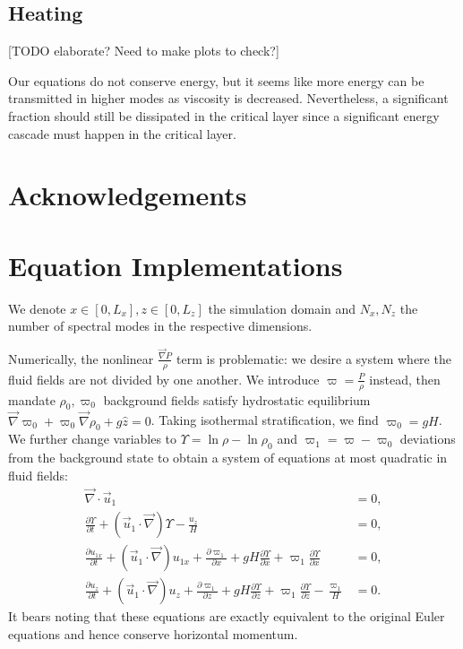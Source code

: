 \documentclass[
        fleqn,
        usenatbib,
    ]{mnras}
\newcommand*{\pd}[2]{\frac{\partial#1}{\partial#2}}
\newcommand*{\p}[1]{\left(#1\right)}
\begin{document}
\subsection{Heating}

[TODO elaborate? Need to make plots to check?]

Our equations do not conserve energy, but it seems like more energy can be
transmitted in higher modes as viscosity is decreased. Nevertheless, a
significant fraction should still be dissipated in the critical layer since a
significant energy cascade must happen in the critical layer.

\section{Acknowledgements}\label{s:ack}




\clearpage
\onecolumn
\appendix

\section{Equation Implementations}\label{ss:strat_impl}

We denote $x \in [0, L_x], z \in [0, L_z]$ the simulation domain and $N_x, N_z$
the number of spectral modes in the respective dimensions.

Numerically, the nonlinear $\frac{\vec{\nabla}P}{\rho}$ term is problematic: we
desire a system where the fluid fields are not divided by one another. We
introduce $\varpi = \frac{P}{\rho}$ instead, then mandate $\rho_0, \varpi_0$
background fields satisfy hydrostatic equilibrium $\vec{\nabla}\varpi_0 +
\varpi_0 \vec{\nabla}\rho_0 + g\hat{z} = 0$. Taking isothermal stratification,
we find $\varpi_0 = gH$. We further change variables to $\Upsilon = \ln \rho -
\ln \rho_0$ and $\varpi_1 = \varpi - \varpi_0$ deviations from the background
state to obtain a system of equations at most quadratic in fluid fields:
\begin{subequations}\label{se:nl_var}
    \begin{align}
        \vec{\nabla} \cdot \vec{u}_1 &= 0,\\
        \pd{\Upsilon}{t} + \p{\vec{u}_1 \cdot \vec{\nabla}} \Upsilon
            - \frac{u_z}{H} &= 0,\\
        \pd{u_{1x}}{t} + \p{\vec{u}_1 \cdot \vec{\nabla}}u_{1x}
            + \pd{\varpi_1}{x} + gH\pd{\Upsilon}{x}
            + \varpi_1 \pd{\Upsilon}{x} &= 0,\\
        \pd{u_z}{t} + \p{\vec{u}_1 \cdot \vec{\nabla}}u_z
            + \pd{\varpi_1}{z} + gH\pd{\Upsilon}{z}
            + \varpi_1 \pd{\Upsilon}{z} - \frac{\varpi_1}{H} &= 0.
    \end{align}
\end{subequations}
It bears noting that these equations are exactly equivalent to the original
Euler equations and hence conserve horizontal momentum.
\end{document}
